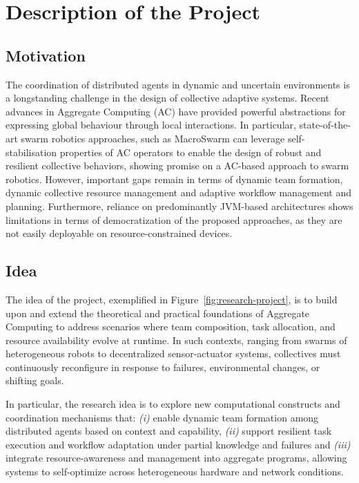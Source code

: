 \documentclass[12pt]{article}
\begin{document}
\section{Description of the Project}
\subsection{Motivation}
The coordination of distributed agents in dynamic and uncertain environments is a longstanding challenge in the design of collective adaptive systems. 
Recent advances in Aggregate Computing (AC) have provided powerful abstractions for expressing global behaviour through local interactions.
In particular, state-of-the-art swarm robotics approaches, such as MacroSwarm can leverage self-stabilisation properties of AC operators to enable
the design of robust and resilient collective behaviors, showing promise on a AC-based approach to swarm robotics.
However, important gaps remain in terms of dynamic team formation, dynamic collective resource management and adaptive workflow management and planning.
Furthermore, reliance on predominantly JVM-based architectures shows limitations in terms of democratization of the proposed approaches, as they are not easily deployable on resource-constrained devices.

\subsection{Idea}
The idea of the project, exemplified in Figure~\ref{fig:research-project}, is to build upon and extend the theoretical and practical foundations of Aggregate Computing to address scenarios where team composition, 
task allocation, and resource availability evolve at runtime. In such contexts, ranging from swarms of heterogeneous robots to decentralized sensor-actuator 
systems, collectives must continuously reconfigure in response to failures, environmental changes, or shifting goals.

In particular, the research idea is to explore new computational constructs and coordination mechanisms that:
\textit{(i)} enable dynamic team formation among distributed agents based on context and capability, 
\textit{(ii)} support resilient task execution and workflow adaptation under partial knowledge and failures and
\textit{(iii)} integrate resource-awareness and management into aggregate programs, allowing systems to self-optimize across heterogeneous hardware and network conditions.
\end{document}
